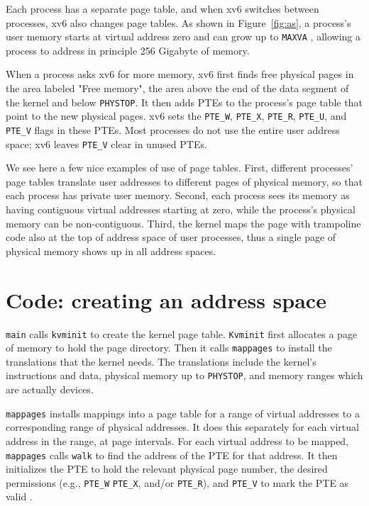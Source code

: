 Each process has a separate page table, and when xv6 switches between
processes, xv6 also changes page tables.
As shown in
Figure~\ref{fig:as},
a process's user memory starts at virtual address
zero and can grow up to
\texttt{MAXVA}
,
allowing a process to address in principle 256 Gigabyte of memory.

When a process asks xv6 for more memory,
xv6 first finds free physical pages in the area
labeled "Free memory", the area above the end of the data segment
of the kernel and below
\texttt{PHYSTOP}.
It then adds PTEs to the process's page table that point
to the new physical pages.
xv6 sets the
\lstinline{PTE_W},
\lstinline{PTE_X},
\lstinline{PTE_R},
\lstinline{PTE_U},
and
\lstinline{PTE_V}
flags in these PTEs.
Most processes do not use the entire user address space;
xv6 leaves
\lstinline{PTE_V}
clear in unused PTEs.

We see here a few nice examples of use of page tables.  First,
different processes' page tables translate user addresses to different
pages of physical memory, so that each process has private user
memory.  Second, each process sees its memory as having contiguous
virtual addresses starting at zero, while the process's physical
memory can be non-contiguous.  Third, the kernel maps the page with
trampoline code also at the top of address space of user processes,
thus a single page of physical memory shows up in all address spaces.
\section{Code: creating an address space}

\lstinline{main}
calls
\lstinline{kvminit}
to create the kernel page table.
\lstinline{Kvminit}
first allocates a page of memory to hold the page directory.
Then it calls
\lstinline{mappages}
to install the translations that the kernel needs.
The translations include the kernel's
instructions and data, physical memory up to
\lstinline{PHYSTOP},
and memory ranges which are actually devices.

\lstinline{mappages}
installs mappings into a page table
for a range of virtual addresses to
a corresponding range of physical addresses.
It does this separately for each virtual address in the range,
at page intervals.
For each virtual address to be mapped,
\lstinline{mappages}
calls
\lstinline{walk}
to find the address of the PTE for that address.
It then initializes the PTE to hold the relevant physical page
number, the desired permissions (e.g.,
\lstinline{PTE_W}
\lstinline{PTE_X},
and/or
\lstinline{PTE_R}),
and
\lstinline{PTE_V}
to mark the PTE as valid
.

